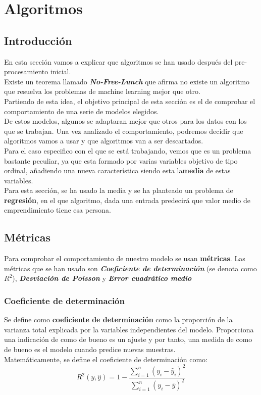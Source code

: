 \section{Algoritmos}
\subsection{Introducción}
En esta sección vamos a explicar que algoritmos se han usado después del pre-procesamiento inicial.\\
Existe un teorema llamado\textbf{ \textit{No-Free-Lunch}} que afirma no existe un algoritmo que resuelva los problemas de machine learning mejor que otro.\\
Partiendo de esta idea, el objetivo principal de esta sección es el de comprobar el comportamiento de una serie de modelos elegidos. \\
De estos modelos, algunos se adaptaran mejor que otros para los datos con los que se trabajan. Una vez analizado el comportamiento, podremos decidir que algoritmos vamos a usar y que algoritmos van a ser descartados. \\
\linebreak
Para el caso especifico con el que se está trabajando, vemos que es un problema bastante peculiar, ya que esta formado por varias variables objetivo de tipo ordinal, añadiendo una nueva característica siendo esta la\textbf{media} de estas variables.\\
Para esta sección, se ha usado la media y se ha planteado un problema de \textbf{regresión}, en el que algoritmo, dada una entrada predecirá que valor medio de emprendimiento tiene esa persona.

\subsection{Métricas}
Para comprobar el comportamiento de nuestro modelo se usan \textbf{métricas}.  Las métricas que se han usado son \textit{\textbf{Coeficiente de determinación}} (se denota como $R^2$), \textit{\textbf{Desviación de Poisson}} y \textit{\textbf{Error cuadrático medio}}
\subsubsection{Coeficiente de determinación}
Se define como \textbf{coeficiente de determinación} como la proporción de la varianza total explicada por la variables independientes del modelo. Proporciona una indicación de como de bueno es un ajuste y por tanto, una medida de como de bueno es el modelo cuando predice nuevas muestras.\\
\linebreak
Matemáticamente, se define el coeficiente de determinación como:
\[
	R^2 (y, \hat{y}) = 1 - \frac{\sum_{i=1}^{n}(y_i - \hat{y}_i)^2}    {\sum_{i=1}^{n} (y_i - \overline{y})^2}
\]

